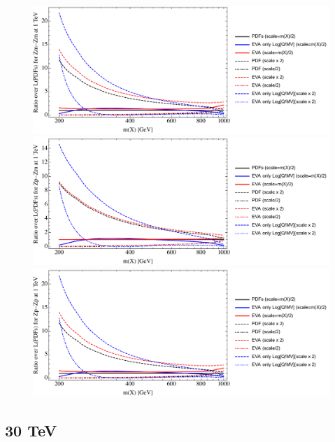 \documentclass[a4paper,11pt]{article}
\begin{document}
\begin{figure}[ht]
\includegraphics[width=0.46\linewidth]{PlotLumi/1TeV/ratios/Zm-Zm.pdf}
\includegraphics[width=0.46\linewidth]{PlotLumi/1TeV/ratios/Zp-Zm.pdf}
\includegraphics[width=0.46\linewidth]{PlotLumi/1TeV/ratios/Zp-Zp.pdf}
\end{figure}

%
%
%

\clearpage
\subsection{30 TeV}
\end{document}
